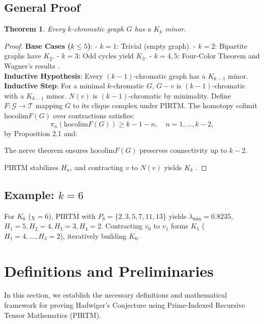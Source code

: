 \documentclass{article}
\theoremstyle{plain}
\newtheorem{theorem}{Theorem}
\begin{document}
\subsection{General Proof}
\begin{theorem}
Every \( k \)-chromatic graph \( G \) has a \( K_k \) minor.
\end{theorem}
\begin{proof}
\textbf{Base Cases (\( k \leq 5 \))}:  
- \( k = 1 \): Trivial (empty graph).  
- \( k = 2 \): Bipartite graphs have \( K_2 \).  
- \( k = 3 \): Odd cycles yield \( K_3 \).  
- \( k = 4, 5 \): Four-Color Theorem and Wagner’s results \cite{wagner1937}. \\
\textbf{Inductive Hypothesis}: Every \( (k-1) \)-chromatic graph has a \( K_{k-1} \) minor. \\
\textbf{Inductive Step}: For a minimal \( k \)-chromatic \( G \), \( G - v \) is \( (k-1) \)-chromatic with a \( K_{k-1} \) minor. \( N(v) \) is \( (k-1) \)-chromatic by minimality. Define \( F: \mathcal{G} \to \mathcal{T} \) mapping \( G \) to its clique complex under PIRTM. The homotopy colimit \( \text{hocolim} F(G) \) over contractions satisfies:
\[
\pi_n(\text{hocolim} F(G)) \geq k - 1 - n, \quad n = 1, \ldots, k-2,
\]
by Proposition 2.1 and:
\begin{lemma}[Lemma 4.1]
The nerve theorem \cite{bousfield1977} ensures \( \text{hocolim} F(G) \) preserves connectivity up to \( k-2 \).
\end{lemma}
PIRTM stabilizes \( H_n \), and contracting \( v \) to \( N(v) \) yields \( K_k \) \cite{robertson1993}.
\end{proof}
\subsection{Example: \( k = 6 \)}
For \( K_6 \) (\( \chi = 6 \)), PIRTM with \( P_6 = \{2, 3, 5, 7, 11, 13\} \) yields \( \lambda_{\text{min}} = 0.8235 \), \( H_1 = 5, H_2 = 4, H_3 = 3, H_4 = 2 \). Contracting \( v_0 \) to \( v_1 \) forms \( K_5 \) (\( H_1 = 4, \ldots, H_3 = 2 \)), iteratively building \( K_6 \).



\section{Definitions and Preliminaries}

In this section, we establish the necessary definitions and mathematical framework for proving Hadwiger's Conjecture using Prime-Indexed Recursive Tensor Mathematics (PIRTM). 
\end{document}
